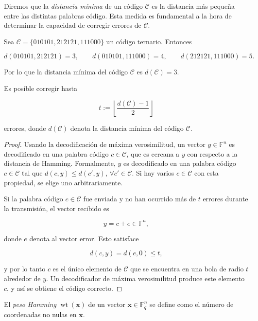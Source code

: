 Diremos que la \emph{distancia mínima} de un código $\mathcal{C}$ es la distancia más pequeña entre las distintas palabras código. Esta medida es fundamental a la hora de determinar la capacidad de corregir errores de $\mathcal{C}$.

\begin{exampleth}
    Sea $\mathcal{C} = \{010101, 212121, 111000\}$ un código ternario. Entonces

    $$d(010101, 212121) = 3, \qquad d(010101, 111000) = 4, \qquad d(212121, 111000) = 5.$$

    Por lo que la distancia mínima del código $\mathcal{C}$ es $d(\mathcal{C}) = 3$.
\end{exampleth}

\begin{theorem}
    \label{th:decodificacion_maxima_verosimilitud}
    Es posible corregir hasta

    $$t := \left\lfloor \frac{d(\mathcal{C}) - 1}{2} \right\rfloor$$

    errores, donde $d(\mathcal{C})$ denota la distancia mínima del código $\mathcal{C}$.
\end{theorem}

\begin{proof}
    Usando la decodificación de máxima verosimilitud, un vector $y \in \mathbb{F}^n$ es decodificado en una palabra código $c  \in \mathcal{C}$, que es cercana a $y$ con respecto a la distancia de Hamming. Formalmente, $y$ es decodificado en una palabra código $c \in \mathcal{C}$ tal que $d(c,y) \leq d(c',y)$, $\forall c' \in \mathcal{C}$. Si hay varios $c \in \mathcal{C}$ con esta propiedad, se elige uno arbitrariamente.

    Si la palabra código $c \in \mathcal{C}$ fue enviada y no han ocurrido más de $t$ errores durante la transmisión, el vector recibido es 

    $$y = c + e \in \mathbb{F}^n,$$

    donde $e$ denota al vector error. Esto satisface 

    $$d(c,y) = d(e,0) \leq t,$$

    y por lo tanto $c$ es el único elemento de $\mathcal{C}$ que se encuentra en una bola de radio $t$ alrededor de $y$. Un decodificador de máxima verosimilitud produce este elemento $c$, y así se obtiene el código correcto.
\end{proof}

\begin{definition}
    El \emph{peso Hamming} $\operatorname{wt}(\mathbf{x})$ de un vector $\mathbf{x} \in \mathbb{F}_q^n$ se define como el número de coordenadas no nulas en $\mathbf{x}$.
\end{definition}

